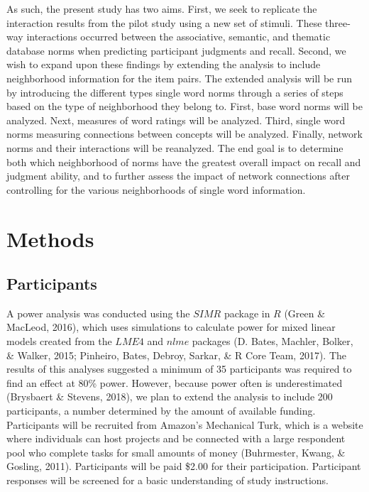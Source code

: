 \documentclass[english,man]{apa6}
\theoremstyle{definition}
\theoremstyle{definition}
\theoremstyle{definition}
\theoremstyle{remark}
\begin{document}
As such, the present study has two aims. First, we seek to replicate the
interaction results from the pilot study using a new set of stimuli.
These three-way interactions occurred between the associative, semantic,
and thematic database norms when predicting participant judgments and
recall. Second, we wish to expand upon these findings by extending the
analysis to include neighborhood information for the item pairs. The
extended analysis will be run by introducing the different types single
word norms through a series of steps based on the type of neighborhood
they belong to. First, base word norms will be analyzed. Next, measures
of word ratings will be analyzed. Third, single word norms measuring
connections between concepts will be analyzed. Finally, network norms
and their interactions will be reanalyzed. The end goal is to determine
both which neighborhood of norms have the greatest overall impact on
recall and judgment ability, and to further assess the impact of network
connections after controlling for the various neighborhoods of single
word information.

\section{Methods}\label{methods}

\subsection{Participants}\label{participants}

A power analysis was conducted using the \(SIMR\) package in \(R\)
(Green \& MacLeod, 2016), which uses simulations to calculate power for
mixed linear models created from the \(LME4\) and \(nlme\) packages (D.
Bates, Machler, Bolker, \& Walker, 2015; Pinheiro, Bates, Debroy,
Sarkar, \& R Core Team, 2017). The results of this analyses suggested a
minimum of 35 participants was required to find an effect at 80\% power.
However, because power often is underestimated (Brysbaert \& Stevens,
2018), we plan to extend the analysis to include 200 participants, a
number determined by the amount of available funding. Participants will
be recruited from Amazon's Mechanical Turk, which is a website where
individuals can host projects and be connected with a large respondent
pool who complete tasks for small amounts of money (Buhrmester, Kwang,
\& Gosling, 2011). Participants will be paid \$2.00 for their
participation. Participant responses will be screened for a basic
understanding of study instructions.
\end{document}
